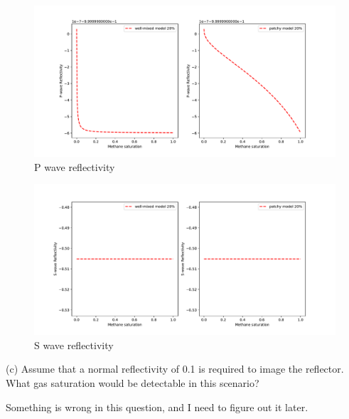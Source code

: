 \begin{solution}
    \begin{figure}[H]
        \centering
        \includegraphics[width=1.0\textwidth]{figures/homework-2/p1-3-b1.pdf}
        \caption{P wave reflectivity}
        \label{fig:p1-3-b1}
    \end{figure}
    \begin{figure}[H]
        \centering
        \includegraphics[width=1.0\textwidth]{figures/homework-2/p1-3-b2.pdf}
        \caption{S wave reflectivity}
        \label{fig:p1-3-b2}
    \end{figure}
\end{solution}


\begin{problem}{(c)}
    Assume that a normal reflectivity of 0.1 is required to image the reflector. What gas saturation would be detectable in this scenario?
\end{problem}

\begin{solution}
    Something is wrong in this question, and I need to figure out it later.
\end{solution}



